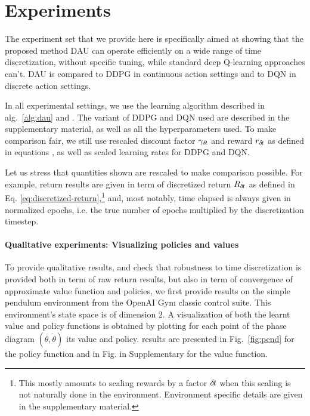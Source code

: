 \section{Experiments}
\label{sec:exp}

The experiment set that we provide here is specifically aimed at showing that
the proposed method DAU can operate efficiently on a wide range of time
discretization, without specific tuning, while standard deep Q-learning
approaches can't. DAU is compared to DDPG in continuous action settings and to DQN in
discrete action settings.

In all experimental settings, we use the learning algorithm described in
alg.~\ref{alg:dau} and . The variant of DDPG and DQN
used are described in the supplementary material, as well as all the hyperparameters
used. To make comparison fair, we still use rescaled discount factor $\gamma_{\delta\hspace{-.1em}t}$ and reward $r_{\delta\hspace{-.1em}t}$  as defined in equations , as well as scaled learning rates for DDPG and DQN.

Let us stress that quantities shown are rescaled to make comparison possible. For example,
return results are given in term of discretized return $R_{\delta\hspace{-.1em}t}$ as defined in Eq. \eqref{eq:discretized-return},\footnote{This mostly amounts to scaling rewards
by a factor ${\delta\hspace{-.1em}t}$ when this scaling is not naturally done in the environment. Environment specific
details are given in the supplementary material.} and, most notably, time elapsed is always given in
normalized epochs, i.e. the true number of epochs multiplied by the discretization timestep.


\paragraph{Qualitative experiments: Visualizing policies and values}
To provide qualitative results, and check that robustness to time
discretization is provided both in term of raw return results, but also in term
of convergence of approximate value function and policies, we first provide results on the simple pendulum environment
from the OpenAI Gym classic control suite.  This environment's state space is of dimension $2$. A visualization of both the learnt value and policy functions is obtained by plotting for each point of the phase diagram $(\theta, \dot{\theta})$ its value and policy. results are presented in
Fig.~\ref{fig:pend} for the policy function and in Fig. in Supplementary  for the value function.

